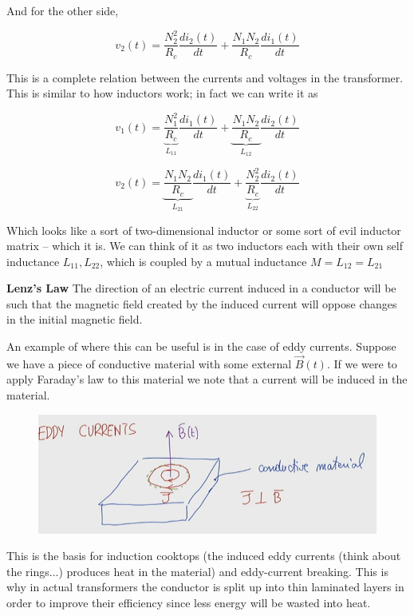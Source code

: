 \documentclass[10pt]{article}
\begin{document}
And for the other side,

\begin{equation}
	v_2(t) = \frac{N_2^2}{R_c} \frac{di_2(t)}{dt} + \frac{N_1N_2}{R_c} \frac{di_1(t)}{dt}
\end{equation}

This is a complete relation between the currents and voltages in the transformer.
This is similar to how inductors work; in fact we can write it as 

\begin{equation}
	v_1(t) = 
	\underbrace{\frac{N_1^2}{R_c} }
	_{L_{11}}
	\frac{di_1(t)}{dt}
	+ 
	\underbrace{\frac{N_1N_2}{R_c}}
	_{L_{12}}
	\frac{di_2(t)}{dt}
\end{equation}

\begin{equation}
	v_2(t) = 
	\underbrace{\frac{N_1N_2}{R_c}}
	_{L_{21}}
	\frac{di_1(t)}{dt}
	+ 
\underbrace{\frac{N_2^2}{R_c}}
	_{L_{22}}
	\frac{di_2(t)}{dt}
\end{equation}

Which looks like a sort of two-dimensional inductor or some sort of evil inductor matrix -- which it is.
We can think of it as two inductors each with their own self inductance $ L_{11}, L_{22}$, which is coupled by a mutual inductance $ M = L_{12} = L_{21} $


\begin{definition}
	\textbf{ Lenz's Law }
	The direction of an electric current induced in a conductor will be such that the magnetic field created by the induced current will oppose changes in the initial magnetic field.

	
\end{definition}

An example of where this can be useful is in the case of eddy currents. 
Suppose we have a piece of conductive material with some external $ \vec{B}(t) $. 
If we were to apply Faraday's law to this material we note that a current will be induced in the material.
\begin{figure}[H]
	\centering
	\includegraphics[width=0.8\linewidth]{img/image_2022-04-18-17-51-01.png}
\end{figure}
This is the basis for induction cooktops (the induced eddy currents (think about the rings...) produces heat in the material) and eddy-current breaking.
This is why in actual transformers the conductor is split up into thin laminated layers in order to improve their efficiency since less energy will be wasted into heat.
\end{document}
